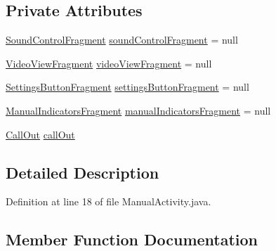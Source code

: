 \subsection*{Private Attributes}
\begin{DoxyCompactItemize}
\item 
\hyperlink{classpt_1_1lsts_1_1asa_1_1fragments_1_1SoundControlFragment}{Sound\+Control\+Fragment} \hyperlink{classpt_1_1lsts_1_1asa_1_1activities_1_1ManualActivity_ac664a082f9a3ef22e1f0c47f813812c6}{sound\+Control\+Fragment} = null
\item 
\hyperlink{classpt_1_1lsts_1_1asa_1_1fragments_1_1VideoViewFragment}{Video\+View\+Fragment} \hyperlink{classpt_1_1lsts_1_1asa_1_1activities_1_1ManualActivity_aeb07ff0e66cda40c01822aa6cb2a751c}{video\+View\+Fragment} = null
\item 
\hyperlink{classpt_1_1lsts_1_1asa_1_1fragments_1_1SettingsButtonFragment}{Settings\+Button\+Fragment} \hyperlink{classpt_1_1lsts_1_1asa_1_1activities_1_1ManualActivity_ae786eea58a48ddece364308cb94c29ac}{settings\+Button\+Fragment} = null
\item 
\hyperlink{classpt_1_1lsts_1_1asa_1_1fragments_1_1ManualIndicatorsFragment}{Manual\+Indicators\+Fragment} \hyperlink{classpt_1_1lsts_1_1asa_1_1activities_1_1ManualActivity_a776bbf934316db1b1c546f2e2ee0697c}{manual\+Indicators\+Fragment} = null
\item 
\hyperlink{classpt_1_1lsts_1_1asa_1_1feedback_1_1CallOut}{Call\+Out} \hyperlink{classpt_1_1lsts_1_1asa_1_1activities_1_1ManualActivity_a7ad4e59a0666d55ef0b3163eb940fb71}{call\+Out}
\end{DoxyCompactItemize}


\subsection{Detailed Description}


Definition at line 18 of file Manual\+Activity.\+java.



\subsection{Member Function Documentation}
\hypertarget{classpt_1_1lsts_1_1asa_1_1activities_1_1ManualActivity_adfddcc7c8bb74a1c3af26e2301aee4cd}{}
